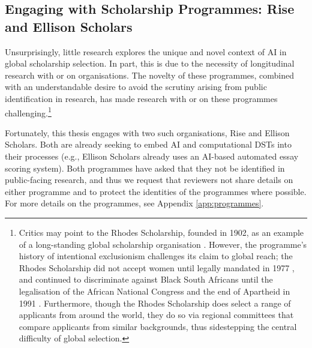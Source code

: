\subsection{Engaging with Scholarship Programmes: Rise and Ellison Scholars}\label{ssec:context_empirical_setting}
Unsurprisingly, little research explores the unique and novel context of AI in global scholarship selection. In part, this is due to the necessity of longitudinal research with or on organisations. The novelty of these programmes, combined with an understandable desire to avoid the scrutiny arising from public identification in research, has made research with or on these programmes challenging.\footnote{Critics may point to the Rhodes Scholarship, founded in 1902, as an example of a long-standing global scholarship organisation \cite{Ziegler_2008}. However, the programme's history of intentional exclusionism challenges its claim to global reach; the Rhodes Scholarship did not accept women until legally mandated in 1977 \cite{Ziegler_2008}, and continued to discriminate against Black South Africans until the legalisation of the African National Congress and the end of Apartheid in 1991 \cite{Ziegler_2008}. Furthermore, though the Rhodes Scholarship does select a range of applicants from around the world, they do so via regional committees that compare applicants from similar backgrounds, thus sidestepping the central difficulty of global selection.}

Fortunately, this thesis engages with two such organisations, Rise and Ellison Scholars. Both are already seeking to embed AI and computational DSTs into their processes (e.g., Ellison Scholars already uses an AI-based automated essay scoring system). Both programmes have asked that they not be identified in public-facing research, and thus we request that reviewers not share details on either programme and to protect the identities of the programmes where possible. For more details on the programmes, see Appendix \ref{app:programmes}.

